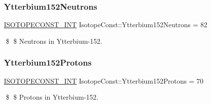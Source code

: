 \subsubsection{\texorpdfstring{Ytterbium152\+Neutrons}{Ytterbium152Neutrons}}
{\footnotesize\ttfamily \mbox{\hyperlink{group___isotope_const-_macros_ga5f18360b3e99483a35c32d789e62621c}{I\+S\+O\+T\+O\+P\+E\+C\+O\+N\+S\+T\+\_\+\+I\+NT}} Isotope\+Const\+::\+Ytterbium152\+Neutrons = 82}

\$ \$ Neutrons in Ytterbium-\/152. \mbox{\label{group___isotope_const-_ytterbium-_yb152_gad2dbb14a9f7c9b85255235dbb1609dcd}} 
\subsubsection{\texorpdfstring{Ytterbium152\+Protons}{Ytterbium152Protons}}
{\footnotesize\ttfamily \mbox{\hyperlink{group___isotope_const-_macros_ga5f18360b3e99483a35c32d789e62621c}{I\+S\+O\+T\+O\+P\+E\+C\+O\+N\+S\+T\+\_\+\+I\+NT}} Isotope\+Const\+::\+Ytterbium152\+Protons = 70}

\$ \$ Protons in Ytterbium-\/152. 